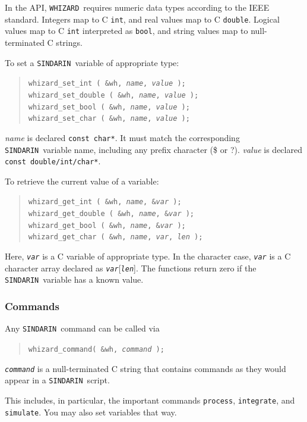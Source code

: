 \documentclass[12pt]{book}
\newcommand{\ttt}[1]{\texttt{#1}}
\newcommand{\whizard}{\ttt{WHIZARD}}
\newcommand{\sindarin}{\ttt{SINDARIN}}
\begin{document}
In the API, \whizard\ requires numeric data types according to the IEEE
standard.  Integers map to C \ttt{int}, and real values map to C
\ttt{double}.  Logical values map to C \ttt{int} interpreted as \ttt{bool},
and string values map to null-terminated C strings.

To set a \sindarin\ variable of appropriate type:
\begin{quote}
  \tt whizard\_set\_int ( \&wh, \textit{name}, \textit{value} );
  \\
  \tt whizard\_set\_double ( \&wh, \textit{name}, \textit{value} );
  \\
  \tt whizard\_set\_bool ( \&wh, \textit{name}, \textit{value} );
  \\
  \tt whizard\_set\_char ( \&wh, \textit{name}, \textit{value} );
\end{quote}
\textit{name} is declared \ttt{const char*}.  It must match the corresponding
\sindarin\ variable name, including any prefix character (\$ or ?).
\textit{value} is declared \ttt{const double/int/char*}.

To retrieve the current value of a variable:
\begin{quote}
  \tt whizard\_get\_int ( \&wh, \textit{name}, \&\textit{var} );
  \\
  \tt whizard\_get\_double ( \&wh, \textit{name}, \&\textit{var} );
  \\
  \tt whizard\_get\_bool ( \&wh, \textit{name}, \&\textit{var} );
  \\
  \tt whizard\_get\_char ( \&wh, \textit{name}, \textit{var}, \textit{len} );
\end{quote}
Here, \ttt{\it var} is a C variable of appropriate type.  In the character
case, \ttt{\it var} is a C character array declared as
\ttt{\it var}[\ttt{\it len}].  The functions return zero if the \sindarin\
variable has a known value.

\subsubsection{Commands}
Any \sindarin\ command can be called via
\begin{quote}
  \tt whizard\_command( \&wh, \textit{command} );
\end{quote}
\ttt{\it command} is a null-terminated C string that contains commands as they
would appear in a \sindarin\ script.

This includes, in particular, the important commands \ttt{process},
\ttt{integrate}, and \ttt{simulate}.  You may also set variables that way.
\end{document}
